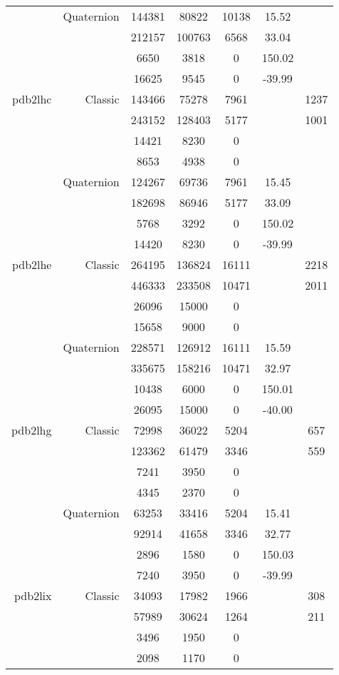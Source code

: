 \begin{xltabular}{\textwidth}{r|rcccSc}
& Quaternion & 144381 & 80822 & 10138 & 15.52 & \\
& & 212157 & 100763 & 6568 & 33.04 & \\
& & 6650 & 3818 & 0 & 150.02 & \\
& & 16625 & 9545 & 0 & -39.99 & \\ \addlinespace
pdb2lhc & Classic & 143466 & 75278 & 7961 & & 1237 \\
& & 243152 & 128403 & 5177 & & 1001 \\
& & 14421 & 8230 & 0 & & \\
& & 8653 & 4938 & 0 & & \\
& Quaternion & 124267 & 69736 & 7961 & 15.45 & \\
& & 182698 & 86946 & 5177 & 33.09 & \\
& & 5768 & 3292 & 0 & 150.02 & \\
& & 14420 & 8230 & 0 & -39.99 & \\ \addlinespace
pdb2lhe & Classic & 264195 & 136824 & 16111 & & 2218 \\
& & 446333 & 233508 & 10471 & & 2011 \\
& & 26096 & 15000 & 0 & & \\
& & 15658 & 9000 & 0 & & \\
& Quaternion & 228571 & 126912 & 16111 & 15.59 & \\
& & 335675 & 158216 & 10471 & 32.97 & \\
& & 10438 & 6000 & 0 & 150.01 & \\
& & 26095 & 15000 & 0 & -40.00 & \\ \addlinespace
pdb2lhg & Classic & 72998 & 36022 & 5204 & & 657 \\
& & 123362 & 61479 & 3346 & & 559 \\
& & 7241 & 3950 & 0 & & \\
& & 4345 & 2370 & 0 & & \\
& Quaternion & 63253 & 33416 & 5204 & 15.41 & \\
& & 92914 & 41658 & 3346 & 32.77 & \\
& & 2896 & 1580 & 0 & 150.03 & \\
& & 7240 & 3950 & 0 & -39.99 & \\ \addlinespace
pdb2lix & Classic & 34093 & 17982 & 1966 & & 308 \\
& & 57989 & 30624 & 1264 & & 211 \\
& & 3496 & 1950 & 0 & & \\
& & 2098 & 1170 & 0 & & \\

\end{xltabular}
